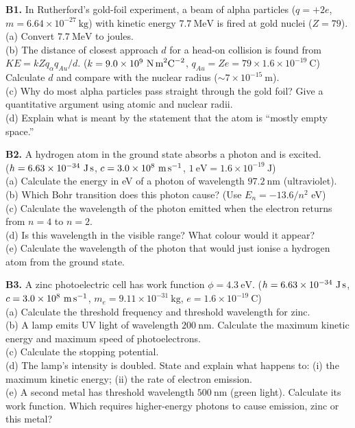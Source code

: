 \begin{exercisebox}[27]
\textbf{B1.} In Rutherford's gold-foil experiment,
a beam of alpha particles ($q = +2e$,
$m = 6.64\times10^{-27}\ \text{kg}$) with kinetic
energy $7.7\ \text{MeV}$ is fired at gold nuclei
($Z = 79$).\\[4pt]
(a) Convert $7.7\ \text{MeV}$ to joules.\\
(b) The distance of closest approach $d$ for a
head-on collision is found from
$KE = kZq_\alpha q_{Au}/d$.
($k = 9.0\times10^9\ \text{N\,m}^2\text{C}^{-2}$,
$q_{Au} = Ze = 79 \times 1.6\times10^{-19}\ \text{C}$)
Calculate $d$ and compare with the nuclear radius
($\sim 7\times10^{-15}\ \text{m}$).\\
(c) Why do most alpha particles pass straight
through the gold foil? Give a quantitative
argument using atomic and nuclear radii.\\
(d) Explain what is meant by the statement that
the atom is ``mostly empty space.''
\hfill{}

\vspace{0.4cm}

\textbf{B2.} A hydrogen atom in the ground state
absorbs a photon and is excited.\\
($h = 6.63\times10^{-34}\ \text{J\,s}$,
$c = 3.0\times10^8\ \text{m\,s}^{-1}$,
$1\ \text{eV} = 1.6\times10^{-19}\ \text{J}$)\\[4pt]
(a) Calculate the energy in eV of a photon of
wavelength $97.2\ \text{nm}$ (ultraviolet).\\
(b) Which Bohr transition does this photon cause?
(Use $E_n = -13.6/n^2$ eV)\\
(c) Calculate the wavelength of the photon emitted
when the electron returns from $n=4$ to $n=2$.\\
(d) Is this wavelength in the visible range? What
colour would it appear?\\
(e) Calculate the wavelength of the photon that
would just ionise a hydrogen atom from the ground
state.
\hfill{}

\vspace{0.4cm}

\textbf{B3.} A zinc photoelectric cell has work
function $\phi = 4.3\ \text{eV}$.
($h = 6.63\times10^{-34}\ \text{J\,s}$,
$c = 3.0\times10^8\ \text{m\,s}^{-1}$,
$m_e = 9.11\times10^{-31}\ \text{kg}$,
$e = 1.6\times10^{-19}\ \text{C}$)\\[4pt]
(a) Calculate the threshold frequency and
threshold wavelength for zinc.\\
(b) A lamp emits UV light of wavelength $200\ \text{nm}$.
Calculate the maximum kinetic energy and maximum
speed of photoelectrons.\\
(c) Calculate the stopping potential.\\
(d) The lamp's intensity is doubled. State and
explain what happens to: (i) the maximum kinetic
energy; (ii) the rate of electron emission.\\
(e) A second metal has threshold wavelength
$500\ \text{nm}$ (green light). Calculate its
work function. Which requires higher-energy photons
to cause emission, zinc or this metal?
\hfill{}


\end{exercisebox}
